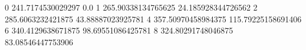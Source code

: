0 241.7174530029297 0.0
1 265.90338134765625 24.185928344726562
2 285.6063232421875 43.88887023925781
4 357.50970458984375 115.79225158691406
6 340.4129638671875 98.69551086425781
8 324.80291748046875 83.08546447753906
